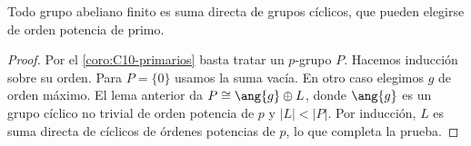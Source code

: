 \begin{coro}\label{coro:C10-existencia-ciclicos}
Todo grupo abeliano finito es suma directa de grupos cíclicos, que pueden elegirse de orden potencia de primo.
\end{coro}
\begin{proof}
Por el \cref{coro:C10-primarios} basta tratar un $p$-grupo $P$. Hacemos inducción sobre su orden. Para $P=\{0\}$ usamos la suma vacía. En otro caso elegimos $g$ de orden máximo. El lema anterior da $P\cong\ang{g}\oplus L$, donde $\ang{g}$ es un grupo cíclico no trivial de orden potencia de $p$ y $|L|<|P|$. Por inducción, $L$ es suma directa de cíclicos de órdenes potencias de $p$, lo que completa la prueba.
\end{proof}

